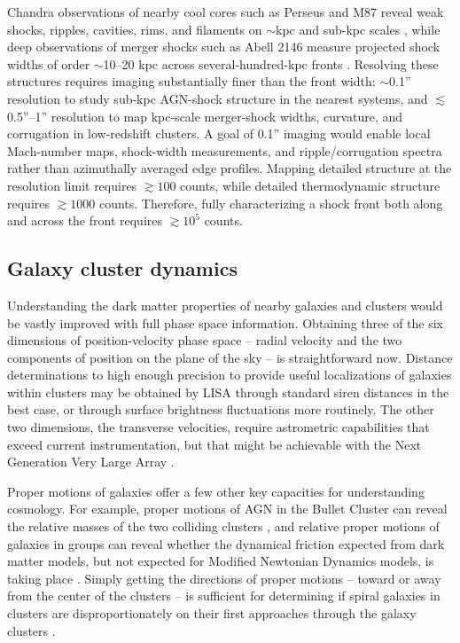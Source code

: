\documentclass[fleqn,10pt]{SelfArx}
\begin{document}
Chandra observations of nearby cool cores such as Perseus and M87 reveal weak shocks, ripples, cavities, rims, and filaments on $\sim$kpc and sub-kpc scales \citep{Fabian2003,Fabian2006,Forman2007}, while deep observations of merger shocks such as Abell 2146 measure projected shock widths of order $\sim$10–20 kpc across several-hundred-kpc fronts \citep{Russell2022}. Resolving these structures requires imaging substantially finer than the front width: $\sim$0.1'' resolution to study sub-kpc AGN-shock structure in the nearest systems, and $\lesssim$0.5''–1'' resolution to map kpc-scale merger-shock widths, curvature, and corrugation in low-redshift clusters. A goal of 0.1'' imaging would enable local Mach-number maps, shock-width measurements, and ripple/corrugation spectra rather than azimuthally averaged edge profiles. Mapping detailed structure at the resolution limit requires $\gtrsim 100$ counts, while detailed thermodynamic structure requires $\gtrsim 1000$ counts. Therefore, fully characterizing a shock front both along and across the front requires $\gtrsim 10^5$ counts.

\subsection{Galaxy cluster dynamics}

Understanding the dark matter properties of nearby galaxies and clusters would be vastly improved with full phase space information. Obtaining three of the six dimensions of position-velocity phase space -- radial velocity and the two components of position on the plane of the sky -- is straightforward now. Distance determinations to high enough precision to provide useful localizations of galaxies within clusters may be obtained by LISA through standard siren distances in the best case, or through surface brightness fluctuations more routinely. The other two dimensions, the transverse velocities, require astrometric capabilities that exceed current instrumentation, but that might be achievable with the Next Generation Very Large Array \citep{2018ASPC..517..663M}.

Proper motions of galaxies offer a few other key capacities for understanding cosmology. For example, proper motions of AGN in the Bullet Cluster can reveal the relative masses of the two colliding clusters \citep{2018ASPC..517..663M}, and relative proper motions of galaxies in groups can reveal whether the dynamical friction expected from dark matter models, but not expected for Modified Newtonian Dynamics models, is taking place \citep{2017MNRAS.467..273O}. Simply getting the directions of proper motions -- toward or away from the center of the clusters -- is sufficient for determining if spiral galaxies in clusters are disproportionately on their first approaches through the galaxy clusters \citep{2018ASPC..517..663M}.
\end{document}
